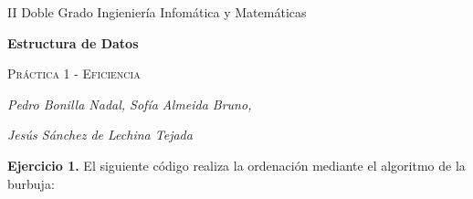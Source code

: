 \documentclass[titlepage, 12pt,a4paper]{article}
\author{Pedro Bonilla Nadal, Sofía Almeida Bruno, Jesús Sáchez de Lechina Tejada}
\date{\small{}}
\begin{document}
\begin{titlepage}
	\vspace{1cm}
	\centering
	{\small II Doble Grado Ingieniería Infomática y Matemáticas  \par}
	\vspace{3.5cm}
	{\huge\bfseries  Estructura de Datos\par}
	\vspace{2.5cm}
	{\scshape\Large Práctica 1 - Eficiencia\par}
	\vspace{2cm}
	{\Large\itshape Pedro Bonilla Nadal, Sofía Almeida Bruno,  \par}
	{\Large\itshape Jesús Sánchez de Lechina Tejada \par}
	\vfill

	\vfill

	{\large \par}
\end{titlepage}


	\textbf{\large Ejercicio 1.} El siguiente código realiza la ordenación mediante el algoritmo de la burbuja:\vspace {1em}
	
\end{document}
